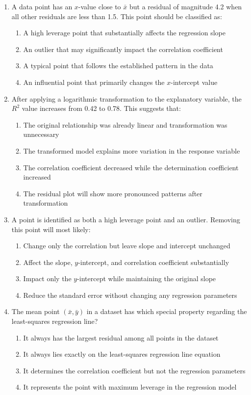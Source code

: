 \documentclass[11pt]{article}
\begin{document}
\begin{enumerate}
\item A data point has an $x$-value close to $\bar{x}$ but a residual of magnitude 4.2 when all other residuals are less than 1.5. This point should be classified as:
\begin{enumerate}[label=(\Alph*)]
\item A high leverage point that substantially affects the regression slope
\item An outlier that may significantly impact the correlation coefficient
\item A typical point that follows the established pattern in the data
\item An influential point that primarily changes the $x$-intercept value
\end{enumerate}

\item After applying a logarithmic transformation to the explanatory variable, the $R^2$ value increases from 0.42 to 0.78. This suggests that:
\begin{enumerate}[label=(\Alph*)]
\item The original relationship was already linear and transformation was unnecessary
\item The transformed model explains more variation in the response variable
\item The correlation coefficient decreased while the determination coefficient increased
\item The residual plot will show more pronounced patterns after transformation
\end{enumerate}

\item A point is identified as both a high leverage point and an outlier. Removing this point will most likely:
\begin{enumerate}[label=(\Alph*)]
\item Change only the correlation but leave slope and intercept unchanged
\item Affect the slope, $y$-intercept, and correlation coefficient substantially
\item Impact only the $y$-intercept while maintaining the original slope
\item Reduce the standard error without changing any regression parameters
\end{enumerate}

\item The mean point $(\bar{x}, \bar{y})$ in a dataset has which special property regarding the least-squares regression line?
\begin{enumerate}[label=(\Alph*)]
\item It always has the largest residual among all points in the dataset
\item It always lies exactly on the least-squares regression line equation
\item It determines the correlation coefficient but not the regression parameters
\item It represents the point with maximum leverage in the regression model
\end{enumerate}


\end{enumerate}
\end{document}
